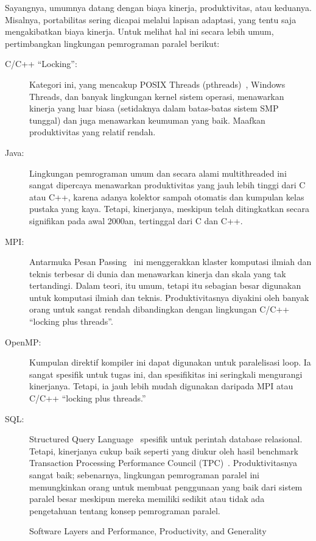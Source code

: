 Sayangnya, umumnya datang dengan biaya kinerja, produktivitas, atau keduanya.
Misalnya, portabilitas sering dicapai melalui lapisan adaptasi, yang tentu saja
mengakibatkan biaya kinerja. Untuk melihat hal ini secara lebih umum,
pertimbangkan lingkungan pemrograman paralel berikut:

\begin{description}
\item[C/C++ ``Locking'':] Kategori ini, yang mencakup POSIX Threads
	(pthreads)~\cite{OpenGroup1997pthreads}, Windows Threads, dan
	banyak lingkungan kernel sistem operasi, menawarkan kinerja yang
	luar biasa (setidaknya dalam batas-batas sistem SMP tunggal) dan
	juga menawarkan keumuman yang baik.
	Maafkan produktivitas yang relatif rendah.
\item[Java:] Lingkungan pemrograman umum dan secara alami multithreaded
	ini sangat dipercaya menawarkan produktivitas yang jauh lebih tinggi
	dari C atau C++, karena adanya kolektor sampah otomatis dan kumpulan
	kelas pustaka yang kaya.
	Tetapi, kinerjanya, meskipun telah ditingkatkan secara signifikan
	pada awal 2000an, tertinggal dari C dan C++.
\item[MPI:] Antarmuka Pesan Passing~\cite{MPIForum2008} ini menggerakkan
	klaster komputasi ilmiah dan teknis terbesar di dunia dan menawarkan
	kinerja dan skala yang tak tertandingi.
	Dalam teori, itu umum, tetapi itu sebagian besar digunakan untuk
	komputasi ilmiah dan teknis.
	Produktivitasnya diyakini oleh banyak orang untuk sangat rendah
	dibandingkan dengan lingkungan C/C++ ``locking plus threads''.
\item[OpenMP:] Kumpulan direktif kompiler ini dapat digunakan untuk
	paralelisasi loop.
	Ia sangat spesifik untuk tugas ini, dan spesifikitas ini seringkali
	mengurangi kinerjanya.
	Tetapi, ia jauh lebih mudah digunakan daripada MPI atau C/C++
	``locking plus threads.''
\item[SQL:] Structured Query Language~\cite{DIS9075SQL92} spesifik untuk
	perintah database relasional.
	Tetapi, kinerjanya cukup baik seperti yang diukur oleh hasil benchmark
	Transaction Processing Performance Council (TPC)~\cite{TPC}.
	Produktivitasnya sangat baik; sebenarnya, lingkungan pemrograman
	paralel ini memungkinkan orang untuk membuat penggunaan yang baik
	dari sistem paralel besar meskipun mereka memiliki sedikit atau
	tidak ada pengetahuan tentang konsep pemrograman paralel.
\end{description}

\begin{figure}
\centering
{}
\caption{Software Layers and Performance, Productivity, and Generality}
\label{fig:intro:Software Layers and Performance; Productivity; and Generality}
\end{figure}

